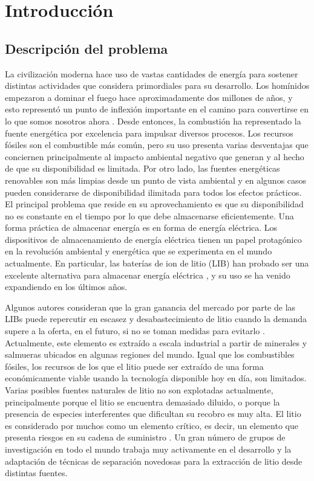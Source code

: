 \chapter{Introducción}

\section{Descripción del problema}\label{sec:descrip} %
La civilización moderna hace uso de vastas cantidades de energía para sostener distintas actividades que considera primordiales para su desarrollo. Los homínidos empezaron a dominar el fuego hace aproximadamente dos millones de años, y esto representó un punto de inflexión importante en el camino para convertirse en lo que somos nosotros ahora \citep{Gowlett2016}. Desde entonces, la combustión ha representado la fuente energética por excelencia para impulsar diversos procesos. Los recursos fósiles son el combustible más común, pero su uso presenta varias desventajas que conciernen principalmente al impacto ambiental negativo que generan y al hecho de que su disponibilidad es limitada. Por otro lado, las fuentes energéticas renovables son más limpias desde un punto de vista ambiental y en algunos casos pueden considerarse de disponibilidad ilimitada para todos los efectos prácticos. El principal problema que reside en su aprovechamiento es que su disponibilidad no es constante en el tiempo por lo que debe almacenarse eficientemente. Una forma práctica de almacenar energía es en forma de energía eléctrica. Los dispositivos de almacenamiento de energía eléctrica tienen un papel protagónico en la revolución ambiental y energética que se experimenta en el mundo actualmente. En particular, las baterías de ion de litio (LIB) han probado ser una excelente alternativa para almacenar energía eléctrica \citep{Chen2020}, y su uso se ha venido expandiendo en los últimos años.

Algunos autores consideran que la gran ganancia del mercado por parte de las LIBs puede repercutir en escasez y desabastecimiento de litio cuando la demanda supere a la oferta, en el futuro, si no se toman medidas para evitarlo \citep{SVERDRUP2016, VIKSTROM2013, Benson2017, Chagnes2015}. Actualmente, este elemento es extraído a escala industrial a partir de minerales y salmueras ubicados en algunas regiones del mundo. Igual que los combustibles fósiles, los recursos de los que el litio puede ser extraído de una forma económicamente viable usando la tecnología disponible hoy en día, son limitados. Varias posibles fuentes naturales de litio no son explotadas actualmente, principalmente porque el litio se encuentra demasiado diluido, o porque la presencia de especies interferentes que dificultan su recobro es muy alta. El litio es considerado por muchos como un elemento crítico, es decir, un elemento que presenta riesgos en su cadena de suministro \citep{Zubi2018}. Un gran número de grupos de investigación en todo el mundo trabaja muy activamente en el desarrollo y la adaptación de técnicas de separación novedosas para la extracción de litio desde distintas fuentes. 

